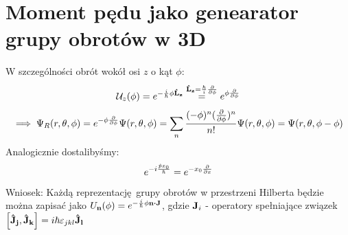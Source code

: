 \documentclass[12pt,a4paper]{report}
\newcommand{\wniosek}[1]{{\color{Apricot} Wniosek:} #1}
\newenvironment{lecture}[1]{\par\medskip
   \noindent\chapter{#1} \rmfamily}{\medskip}
\begin{document}
\begin{lecture}{Moment pędu jako genearator grupy obrotów w 3D}
\[    \]
    W szczególności obrót wokół osi $z$ o kąt $\phi$:
    \[
        \mathcal{U}_z(\varphi) = e^{-\frac{i}{\hbar} \varphi \vb{\hat{L}_z}} \stackrel{\vb{\hat{L}_z} = \frac{\hbar}{i} \pdv{\phi}}{=} e^{\varphi \pdv{\phi}}
    \]
    \[
        \implies \Psi_R(r, \theta, \phi) = e^{-\varphi\pdv{\phi}}\Psi(r, \theta, \phi) = \sum_{n} \frac{(-\varphi)^n (\pdv{\phi})^n}{n!} \Psi(r, \theta, \phi) = \Psi(r, \theta, \phi-\varphi)
    \]
    Analogicznie dostalibyśmy:
    \[
        e^{- i \frac{\hat{p} x_0}{\hbar}} = e^{-x_0 \pdv{x}}
    \]
    \wniosek Każdą reprezentację grupy obrotów w przestrzeni Hilberta będzie można zapisać jako $U_{\vb{n}}(\phi) = e^{-\frac{i}{\hbar} \phi \vb{n}\vdot\vb{J}}$, gdzie $\vb{J}_i$ - operatory spełniające związek $\comm{\vb{\hat{J}_j}}{\vb{\hat{J}_k}} = i \hbar \varepsilon_{jkl}\vb{\hat{J}_l}$\\
    

\end{lecture}
\end{document}

